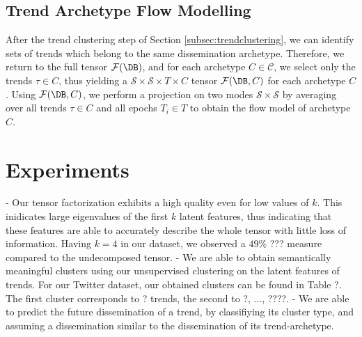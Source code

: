 \subsection{Trend Archetype Flow Modelling}
After the trend clustering step of Section \ref{subsec:trendclustering}, we can identify sets of trends which belong to the same dissemination archetype. 
Therefore, we return to the full tensor $\mathcal{F}(\DB)$, and for each archetype $C\in\mathcal{C}$, we select only the trends $\tau\in C$, thus yielding a $\mathcal{S}\times\mathcal{S}\times T \times C$ tensor $\mathcal{F}(\DB,C)$ for each archetype $C$. Using $\mathcal{F}(\DB,C)$, we perform a projection on two modes $\mathcal{S}\times\mathcal{S}$ by averaging over all trends $\tau\in C$ and all epochs $T_i\in T$ to obtain the flow model of archetype $C$. 



\section{Experiments}
- Our tensor factorization exhibits a high quality even for low values of $k$. This inidicates large eigenvalues of the first $k$ latent features, thus indicating that these features are able to accurately describe the whole tensor with little loss of information. Having $k=4$ in our dataset, we observed a $49\%$ ??? measure compared to the undecomposed tensor. 
- We are able to obtain semantically meaningful clusters using our unsupervised clustering on the latent features of trends. For our Twitter dataset, our obtained clusters can be found in Table ?. The first cluster corresponds to ? trends, the second to ?, ..., ????. 
- We are able to predict the future dissemination of a trend, by classifiying its cluster type, and assuming a dissemination similar to the dissemination of its trend-archetype.

